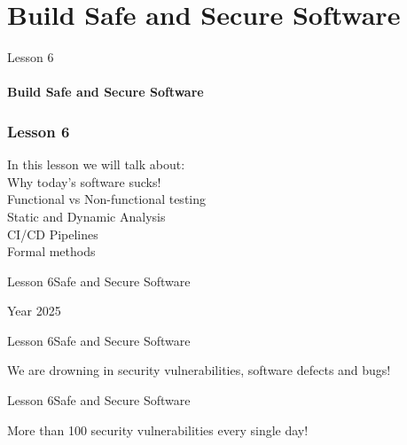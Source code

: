 \documentclass[aspectratio=1610]{beamer}
\begin{document}
\section{Build Safe and Secure Software}

\begin{frame}
\begin{center}
\Huge Lesson 6\\~\\
\textbf{Build Safe and Secure Software}
\end{center}
\end{frame}


\begin{frame}
\frametitle{Lesson 6}
\Huge In this lesson we will talk about:\\
\huge
 \alert{Why today's software sucks!}\\
 \alert{Functional vs Non-functional testing}\\
 \alert{Static and Dynamic Analysis}\\
 \alert{CI/CD Pipelines}\\
 \alert{Formal methods}\\
\end{frame}


\begin{frame}{Lesson 6}{Safe and Secure Software}
\Huge
\begin{center}
Year 2025
\end{center}
\end{frame}


\begin{frame}{Lesson 6}{Safe and Secure Software}
\Huge
\begin{center}
We are drowning in security vulnerabilities, software defects and bugs! 
\end{center}
\end{frame}


\begin{frame}
\end{frame}


\begin{frame}{Lesson 6}{Safe and Secure Software}
\Huge
\begin{center}
More than 100 security vulnerabilities every single day!
\end{center}
\end{frame}
\end{document}
